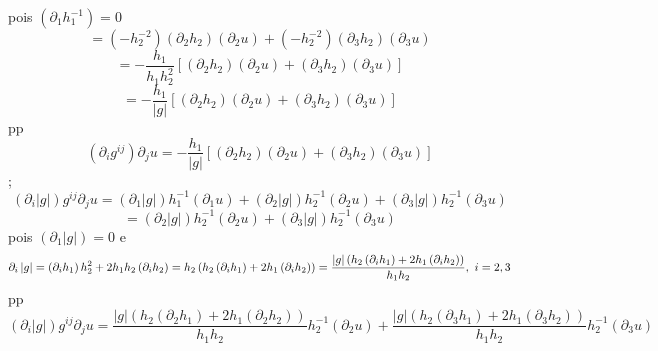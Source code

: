 \documentclass[a4paper,12pt]{article}
\begin{document}
pois $\left( \partial _{1}h_{1}^{-1}\right) =0$%
\begin{equation*}
=\left( -h_{2}^{-2}\right) \left( \partial _{2}h_{2}\right) \left( \partial
_{2}u\right) +\left( -h_{2}^{-2}\right) \left( \partial _{3}h_{2}\right)
\left( \partial _{3}u\right) 
\end{equation*}%
\begin{equation*}
=-\frac{h_{1}}{h_{1}h_{2}^{2}}\left[ \left( \partial _{2}h_{2}\right) \left(
\partial _{2}u\right) +\left( \partial _{3}h_{2}\right) \left( \partial
_{3}u\right) \right] 
\end{equation*}%
\begin{equation*}
=-\frac{h_{1}}{\left\vert g\right\vert }\left[ \left( \partial
_{2}h_{2}\right) \left( \partial _{2}u\right) +\left( \partial
_{3}h_{2}\right) \left( \partial _{3}u\right) \right] 
\end{equation*}%
pp%
\begin{equation*}
\left( \partial _{i}g^{ij}\right) \partial _{j}u=-\frac{h_{1}}{\left\vert
g\right\vert }\left[ \left( \partial _{2}h_{2}\right) \left( \partial
_{2}u\right) +\left( \partial _{3}h_{2}\right) \left( \partial _{3}u\right) %
\right] 
\end{equation*}%
;%
\begin{equation*}
\left( \partial _{i}\left\vert g\right\vert \right) g^{ij}\partial
_{j}u=\left( \partial _{1}\left\vert g\right\vert \right) h_{1}^{-1}\left(
\partial _{1}u\right) +\left( \partial _{2}\left\vert g\right\vert \right)
h_{2}^{-1}\left( \partial _{2}u\right) +\left( \partial _{3}\left\vert
g\right\vert \right) h_{2}^{-1}\left( \partial _{3}u\right) 
\end{equation*}%
\begin{equation*}
=\left( \partial _{2}\left\vert g\right\vert \right) h_{2}^{-1}\left(
\partial _{2}u\right) +\left( \partial _{3}\left\vert g\right\vert \right)
h_{2}^{-1}\left( \partial _{3}u\right) 
\end{equation*}%
pois $\left( \partial _{1}\left\vert g\right\vert \right) =0$ e 
\begin{equation*}
\partial _{i}\left\vert g\right\vert =\left( \partial _{i}h_{1}\right)
h_{2}^{2}+2h_{1}h_{2}\left( \partial _{i}h_{2}\right) =h_{2}\left(
h_{2}\left( \partial _{i}h_{1}\right) +2h_{1}\left( \partial
_{i}h_{2}\right) \right) =\frac{\left\vert g\right\vert \left( h_{2}\left(
\partial _{i}h_{1}\right) +2h_{1}\left( \partial _{i}h_{2}\right) \right) }{%
h_{1}h_{2}},\ i=2,3
\end{equation*}%
pp%
\begin{equation*}
\left( \partial _{i}\left\vert g\right\vert \right) g^{ij}\partial _{j}u=%
\frac{\left\vert g\right\vert \left( h_{2}\left( \partial _{2}h_{1}\right)
+2h_{1}\left( \partial _{2}h_{2}\right) \right) }{h_{1}h_{2}}%
h_{2}^{-1}\left( \partial _{2}u\right) +\frac{\left\vert g\right\vert \left(
h_{2}\left( \partial _{3}h_{1}\right) +2h_{1}\left( \partial
_{3}h_{2}\right) \right) }{h_{1}h_{2}}h_{2}^{-1}\left( \partial _{3}u\right) 
\end{equation*}%
\end{document}
